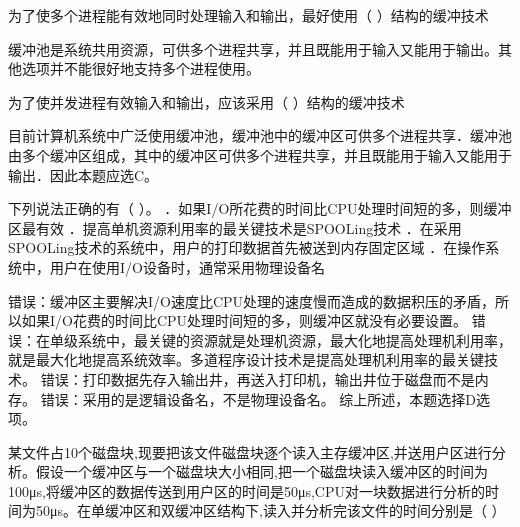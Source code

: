 \question 为了使多个进程能有效地同时处理输入和输出，最好使用（ ）结构的缓冲技术
\par{}
\begin{solution}缓冲池是系统共用资源，可供多个进程共享，并且既能用于输入又能用于输出。其他选项并不能很好地支持多个进程使用。
\end{solution}
\question 为了使并发进程有效输入和输出，应该采用（ ）结构的缓冲技术
\par{}
\begin{solution}目前计算机系统中广泛使用缓冲池，缓冲池中的缓冲区可供多个进程共享．缓冲池由多个缓冲区组成，其中的缓冲区可供多个进程共享，并且既能用于输入又能用于输出．因此本题应选C。
\end{solution}
\question 下列说法正确的有（ ）。
．如果I/O所花费的时间比CPU处理时间短的多，则缓冲区最有效
．提高单机资源利用率的最关键技术是SPOOLing技术
．在采用SPOOLing技术的系统中，用户的打印数据首先被送到内存固定区域
．在操作系统中，用户在使用I/O设备时，通常采用物理设备名
\par{}
\begin{solution}错误：缓冲区主要解决I/O速度比CPU处理的速度慢而造成的数据积压的矛盾，所以如果I/O花费的时间比CPU处理时间短的多，则缓冲区就没有必要设置。
错误：在单级系统中，最关键的资源就是处理机资源，最大化地提高处理机利用率，就是最大化地提高系统效率。多道程序设计技术是提高处理机利用率的最关键技术。
错误：打印数据先存入输出井，再送入打印机，输出井位于磁盘而不是内存。
错误：采用的是逻辑设备名，不是物理设备名。 综上所述，本题选择D选项。
\end{solution}
\question 某文件占10个磁盘块,现要把该文件磁盘块逐个读入主存缓冲区,并送用户区进行分析。假设一个缓冲区与一个磁盘块大小相同,把一个磁盘块读入缓冲区的时间为100μs,将缓冲区的数据传送到用户区的时间是50μs,CPU对一块数据进行分析的时间为50μs。在单缓冲区和双缓冲区结构下,读入并分析完该文件的时间分别是（
）
\par{}
